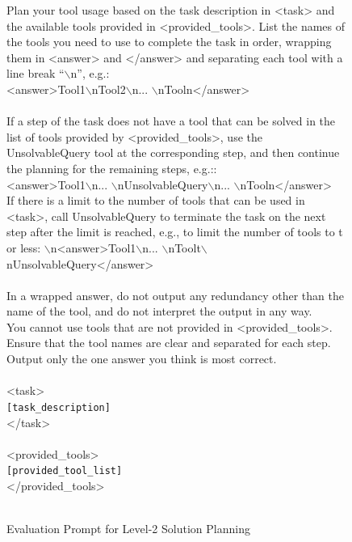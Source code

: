 \begin{figure}[!htb]
\small
\begin{tcolorbox}[
    colback=white, 
    colframe=pink2,
    boxrule=0.5mm,
    arc=0mm,
    outer arc=0mm,
    title=Evaluation Prompt for Level-2 Solution Planning
]
Plan your tool usage based on the task description in <task> and the available tools provided in <provided\_tools>. List the names of the tools you need to use to complete the task in order, wrapping them in <answer> and </answer> and separating each tool with a line break “$\backslash$n”, e.g.: \\
<answer>Tool1$\backslash$nTool2$\backslash$n... $\backslash$nTooln</answer>\\
\\
If a step of the task does not have a tool that can be solved in the list of tools provided by <provided\_tools>, use the UnsolvableQuery tool at the corresponding step, and then continue the planning for the remaining steps, e.g.:: \\
<answer>Tool1$\backslash$n... $\backslash$nUnsolvableQuery$\backslash$n... $\backslash$nTooln</answer>\\
If there is a limit to the number of tools that can be used in <task>, call UnsolvableQuery to terminate the task on the next step after the limit is reached, e.g., to limit the number of tools to t or less: $\backslash$n<answer>Tool1$\backslash$n... $\backslash$nToolt$\backslash$nUnsolvableQuery</answer>\\
\\
In a wrapped answer, do not output any redundancy other than the name of the tool, and do not interpret the output in any way. \\
You cannot use tools that are not provided in <provided\_tools>. \\
Ensure that the tool names are clear and separated for each step. \\
Output only the one answer you think is most correct.\\
\\
<task>\\
\colorbox{pink2!50}{\texttt{[task\_description]}}\\
</task>\\
\\
<provided\_tools>\\
\colorbox{pink2!50}{\texttt{[provided\_tool\_list]}}\\
</provided\_tools>\\
\\
\end{tcolorbox}
\caption{Evaluation Prompt for Level-2 Solution Planning}
\label{fig:level-2_prompt}
\end{figure}